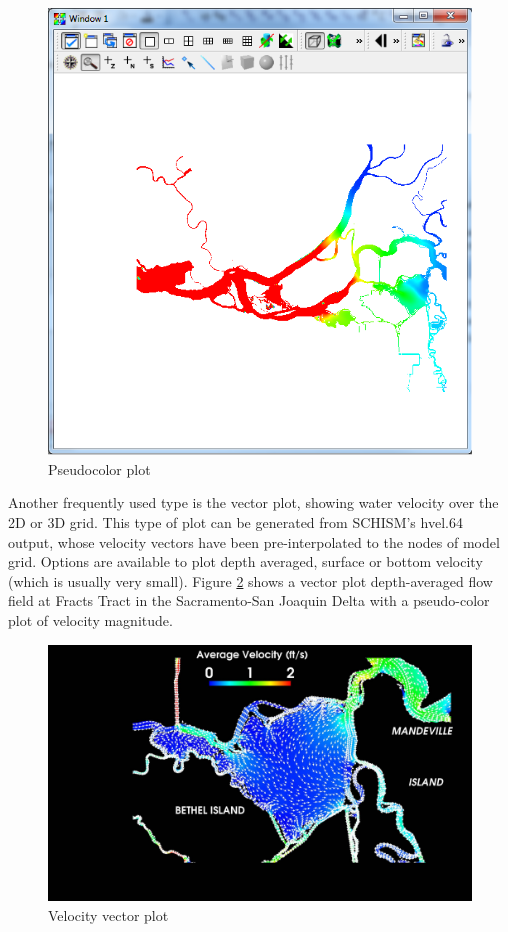 \documentclass[12pt]{report}
\begin{document}
        \begin{figure}
        \includegraphics{colorPlot}
        \caption{Pseudocolor plot }
        \label{figure:colorSalt}
        \end{figure} 
				
			Another frequently used type is the vector plot, showing water velocity over the 2D or 3D grid. 
			This type of plot can be generated from SCHISM's hvel.64 output, 
			whose velocity vectors have been pre-interpolated to the nodes of model grid. Options are available to plot 
			depth averaged, surface or bottom velocity (which is usually very small).
      Figure \ref{figure:fractVelVector} shows a vector plot depth-averaged flow field at Fracts Tract in the Sacramento-San Joaquin
			Delta with a pseudo-color plot of velocity magnitude.

        \begin{figure}
        \begin{center}
        \includegraphics[scale=0.2]{fractVelVector}
        \caption{Velocity vector plot }
        \label{figure:fractVelVector}
        \end{center}
        \end{figure} 
\end{document}
